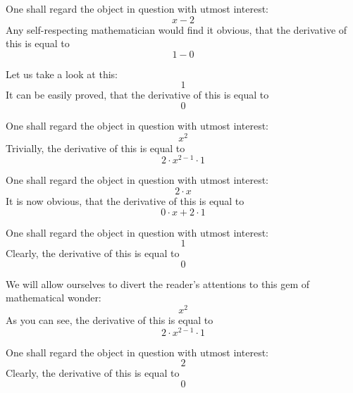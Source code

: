 \documentclass{article}
\begin{document}
One shall regard the object in question with utmost interest:
\begin{equation}
x - 2 
\end{equation}
Any self-respecting mathematician would find it obvious, that the derivative of this is equal to
\begin{equation}
1 - 0 
\end{equation}

Let us take a look at this:
\begin{equation}
1 
\end{equation}
It can be easily proved, that the derivative of this is equal to
\begin{equation}
0 
\end{equation}

One shall regard the object in question with utmost interest:
\begin{equation}
x ^{2 } 
\end{equation}
Trivially, the derivative of this is equal to
\begin{equation}
2 \cdot x ^{2 - 1 } \cdot 1 
\end{equation}

One shall regard the object in question with utmost interest:
\begin{equation}
2 \cdot x 
\end{equation}
It is now obvious, that the derivative of this is equal to
\begin{equation}
0 \cdot x + 2 \cdot 1 
\end{equation}

One shall regard the object in question with utmost interest:
\begin{equation}
1 
\end{equation}
Clearly, the derivative of this is equal to
\begin{equation}
0 
\end{equation}

We will allow ourselves to divert the reader's attentions to this gem of mathematical wonder:
\begin{equation}
x ^{2 } 
\end{equation}
As you can see, the derivative of this is equal to
\begin{equation}
2 \cdot x ^{2 - 1 } \cdot 1 
\end{equation}

One shall regard the object in question with utmost interest:
\begin{equation}
2 
\end{equation}
Clearly, the derivative of this is equal to
\begin{equation}
0 
\end{equation}
\end{document}
